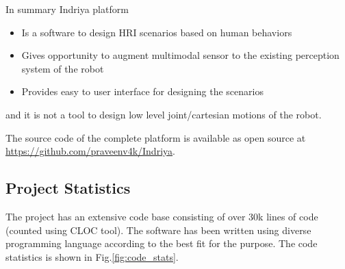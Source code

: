 In summary Indriya platform
\begin{itemize}
\item Is a software to design HRI scenarios based on human behaviors
\item Gives opportunity to augment multimodal sensor to the existing perception system of the robot
\item Provides easy to user interface for designing the scenarios
\end{itemize}
and it is not a tool to design low level joint/cartesian motions of the robot.
	
The source code of the complete platform is available as open source at \url{https://github.com/praveenv4k/Indriya}. 
\subsection{Project Statistics}
The project has an extensive code base consisting of over 30k lines of code (counted using CLOC \cite{cloc} tool). The software has been written using diverse programming language according to the best fit for the purpose. The code statistics is shown in Fig.\ref{fig:code_stats}.

